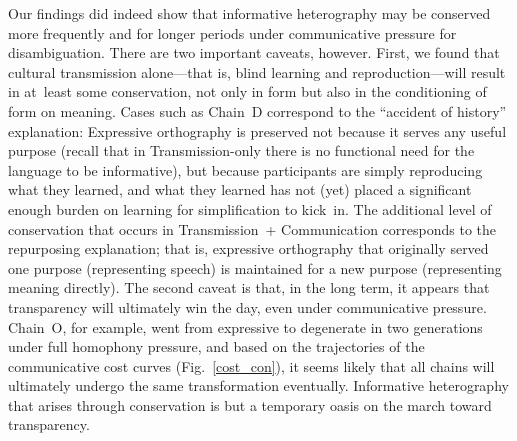 \documentclass[doc,biblatex]{apa7}
\begin{document}
Our findings did indeed show that informative heterography may be conserved more frequently and for longer periods under communicative pressure for disambiguation. There are two important caveats, however. First, we found that cultural transmission alone---that is, blind learning and reproduction---will result in at~least some conservation, not only in form but also in the conditioning of form on meaning. Cases such as Chain~D correspond to the ``accident of history'' explanation: Expressive orthography is preserved not because it serves any useful purpose (recall that in Transmission-only there is no functional need for the language to be informative), but because participants are simply reproducing what they learned, and what they learned has not (yet) placed a significant enough burden on learning for simplification to kick~in. The additional level of conservation that occurs in Transmission~+ Communication corresponds to the repurposing explanation; that is, expressive orthography that originally served one purpose (representing speech) is maintained for a new purpose (representing meaning directly). The second caveat is that, in the long term, it appears that transparency will ultimately win the day, even under communicative pressure. Chain~O, for example, went from expressive to degenerate in two generations under full homophony pressure, and based on the trajectories of the communicative cost curves (Fig.~\ref{cost_con}), it seems likely that all chains will ultimately undergo the same transformation eventually. Informative heterography that arises through conservation is but a temporary oasis on the march toward transparency.
\end{document}
